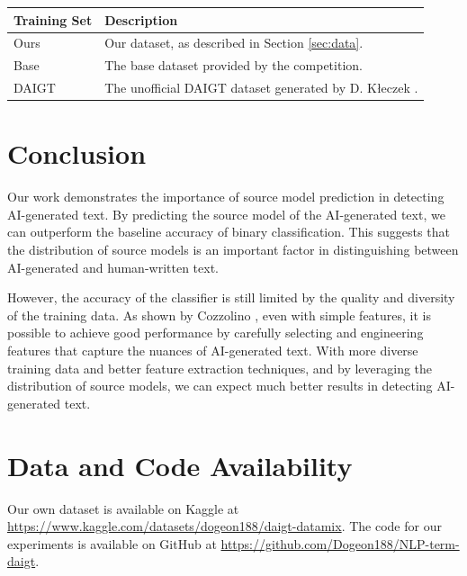 \documentclass[conference]{IEEEtran}
\begin{document}
\begin{table}[htbp]
  \vspace{0.5cm}

  \begin{tabular}{ll}
    \hline
    \textbf{Training Set} & \textbf{Description} \\
    \hline
    Ours & Our dataset, as described in Section \ref{sec:data}. \\
    Base & The base dataset provided by the competition. \\
    DAIGT & The unofficial DAIGT dataset generated by D. Kłeczek \cite{daigtv4}. \\
    \hline
  \end{tabular}
\end{table}

\section{Conclusion}

Our work demonstrates the importance of source model prediction in detecting AI-generated text. By predicting the source model of the AI-generated text, we can outperform the baseline accuracy of binary classification. This suggests that the distribution of source models is an important factor in distinguishing between AI-generated and human-written text.

However, the accuracy of the classifier is still limited by the quality and diversity of the training data. As shown by Cozzolino \cite{6thplace}, even with simple features, it is possible to achieve good performance by carefully selecting and engineering features that capture the nuances of AI-generated text. With more diverse training data and better feature extraction techniques, and by leveraging the distribution of source models, we can expect much better results in detecting AI-generated text.

\section{Data and Code Availability}

Our own dataset is available on Kaggle at \url{https://www.kaggle.com/datasets/dogeon188/daigt-datamix}. The code for our experiments is available on GitHub at \url{https://github.com/Dogeon188/NLP-term-daigt}.



\end{document}
